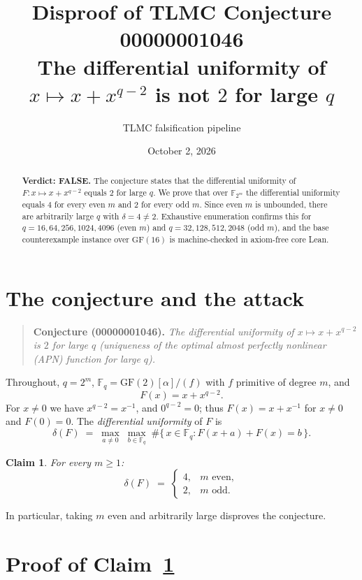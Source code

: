 \documentclass[11pt]{article}
\title{Disproof of TLMC Conjecture 00000001046\\
\large The differential uniformity of $x \mapsto x + x^{q-2}$ is not $2$ for large $q$}
\author{TLMC falsification pipeline}
\date{October 2, 2026}
\newtheorem{claim}{Claim}
\newcommand{\F}{\mathbb{F}}
\newcommand{\GF}{\mathrm{GF}}
\newcommand{\duni}{\delta}
\begin{document}
\maketitle

\begin{abstract}
\noindent
\textbf{Verdict: FALSE.}
The conjecture states that the differential uniformity of
$F\colon x \mapsto x + x^{q-2}$ equals $2$ for large $q$.  We prove that over
$\F_{2^m}$ the differential uniformity equals $4$ for every even $m$ and $2$
for every odd $m$.  Since even $m$ is unbounded, there are arbitrarily large
$q$ with $\duni = 4 \neq 2$.  Exhaustive enumeration confirms this for
$q = 16, 64, 256, 1024, 4096$ (even $m$) and $q = 32, 128, 512, 2048$ (odd
$m$), and the base counterexample instance over $\GF(16)$ is machine-checked
in axiom-free core Lean.
\end{abstract}

\section{The conjecture and the attack}

\begin{quote}
\textbf{Conjecture (00000001046).} \emph{The differential uniformity of
$x \mapsto x + x^{q-2}$ is $2$ for large $q$ (uniqueness of the optimal
almost perfectly nonlinear (APN) function for large $q$).}
\end{quote}

Throughout, $q = 2^m$, $\F_q = \GF(2)[\alpha]/(f)$ with $f$ primitive of
degree $m$, and
\[
F(x) = x + x^{q-2}.
\]
For $x \neq 0$ we have $x^{q-2} = x^{-1}$, and $0^{q-2} = 0$; thus
$F(x) = x + x^{-1}$ for $x \neq 0$ and $F(0) = 0$.  The \emph{differential
uniformity} of $F$ is
\[
\duni(F) \;=\; \max_{a \neq 0} \; \max_{b \in \F_q} \;\#\{\, x \in \F_q : F(x+a) + F(x) = b \,\}.
\]

\begin{claim}\label{claim:main}
For every $m \geq 1$:
\[
\duni(F) \;=\;
\begin{cases}
4, & m \text{ even},\\
2, & m \text{ odd}.
\end{cases}
\]
\end{claim}

In particular, taking $m$ even and arbitrarily large disproves the
conjecture.

\section{Proof of Claim~\ref{claim:main}}
\end{document}
